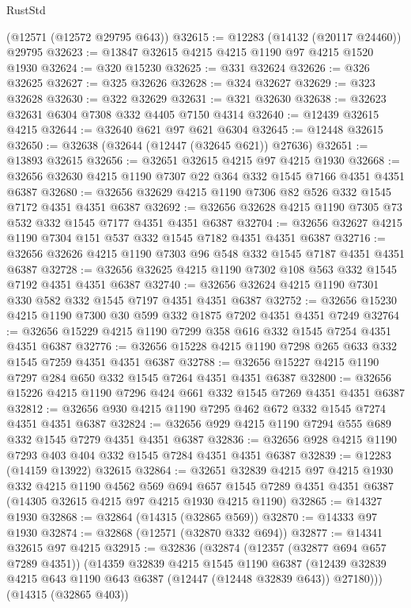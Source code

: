 \begin{lexlean}{RustStd}
\begin{coremodule}
    (@12571 (@12572 @29795 @643))
@32615 := @12283 (@14132 (@20117 @24460)) @29795
@32623 := @13847 @32615 @4215 @4215 @1190 @97 @4215 @1520 @1930
@32624 := @320 @15230
@32625 := @331 @32624
@32626 := @326 @32625
@32627 := @325 @32626
@32628 := @324 @32627
@32629 := @323 @32628
@32630 := @322 @32629
@32631 := @321 @32630
@32638 := @32623 @32631 @6304 @7308 @332 @4405 @7150 @4314
@32640 := @12439 @32615 @4215
@32644 := @32640 @621 @97 @621 @6304
@32645 := @12448 @32615
@32650 := @32638 (@32644 (@12447 (@32645 @621)) @27636)
@32651 := @13893 @32615
@32656 := @32651 @32615 @4215 @97 @4215 @1930
@32668 := @32656 @32630 @4215 @1190 @7307 @22 @364 @332 @1545 @7166 @4351 @4351 @6387
@32680 := @32656 @32629 @4215 @1190 @7306 @82 @526 @332 @1545 @7172 @4351 @4351 @6387
@32692 := @32656 @32628 @4215 @1190 @7305 @73 @532 @332 @1545 @7177 @4351 @4351 @6387
@32704 := @32656 @32627 @4215 @1190 @7304 @151 @537 @332 @1545 @7182 @4351 @4351 @6387
@32716 := @32656 @32626 @4215 @1190 @7303 @96 @548 @332 @1545 @7187 @4351 @4351 @6387
@32728 := @32656 @32625 @4215 @1190 @7302 @108 @563 @332 @1545 @7192 @4351 @4351 @6387
@32740 := @32656 @32624 @4215 @1190 @7301 @330 @582 @332 @1545 @7197 @4351 @4351 @6387
@32752 := @32656 @15230 @4215 @1190 @7300 @30 @599 @332 @1875 @7202 @4351 @4351 @7249
@32764 := @32656 @15229 @4215 @1190 @7299 @358 @616 @332 @1545 @7254 @4351 @4351 @6387
@32776 := @32656 @15228 @4215 @1190 @7298 @265 @633 @332 @1545 @7259 @4351 @4351 @6387
@32788 := @32656 @15227 @4215 @1190 @7297 @284 @650 @332 @1545 @7264 @4351 @4351 @6387
@32800 := @32656 @15226 @4215 @1190 @7296 @424 @661 @332 @1545 @7269 @4351 @4351 @6387
@32812 := @32656 @930 @4215 @1190 @7295 @462 @672 @332 @1545 @7274 @4351 @4351 @6387
@32824 := @32656 @929 @4215 @1190 @7294 @555 @689 @332 @1545 @7279 @4351 @4351 @6387
@32836 := @32656 @928 @4215 @1190 @7293 @403 @404 @332 @1545 @7284 @4351 @4351 @6387
@32839 := @12283 (@14159 @13922) @32615
@32864 := @32651
    @32839
    @4215
    @97
    @4215
    @1930
    @332
    @4215
    @1190
    @4562
    @569
    @694
    @657
    @1545
    @7289
    @4351
    @4351
    @6387
    (@14305 @32615 @4215 @97 @4215 @1930 @4215 @1190)
@32865 := @14327 @1930
@32868 := @32864 (@14315 (@32865 @569))
@32870 := @14333 @97 @1930
@32874 := @32868 (@12571 (@32870 @332 @694))
@32877 := @14341 @32615 @97 @4215
@32915 := @32836
    (@32874
      (@12357 (@32877 @694 @657 @7289 @4351))
      (@14359
        @32839
        @4215
        @1545
        @1190
        @6387
        (@12439 @32839 @4215 @643 @1190 @643 @6387 (@12447 (@12448 @32839 @643)) @27180)))
    (@14315 (@32865 @403))

\end{coremodule}
\end{lexlean}
